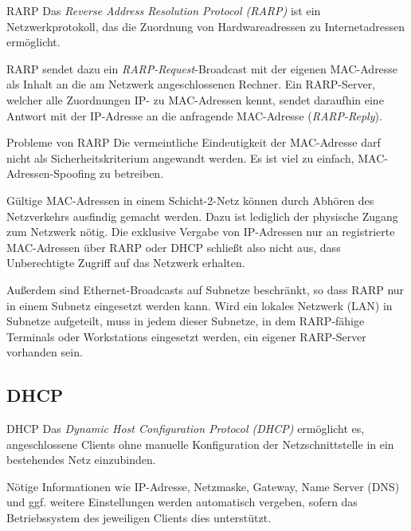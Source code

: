 \begin{defi}{RARP}
    Das \emph{Reverse Address Resolution Protocol (RARP)} ist ein Netzwerkprotokoll, das die Zuordnung von Hardwareadressen zu Internetadressen ermöglicht.

    RARP sendet dazu ein \emph{RARP-Request}-Broadcast mit der eigenen MAC-Adresse als Inhalt an die am Netzwerk angeschlossenen Rechner.
    Ein RARP-Server, welcher alle Zuordnungen IP- zu MAC-Adressen kennt, sendet daraufhin eine Antwort mit der IP-Adresse an die anfragende MAC-Adresse (\emph{RARP-Reply}).
\end{defi}

\begin{bonus}{Probleme von RARP}
    Die vermeintliche Eindeutigkeit der MAC-Adresse darf nicht als Sicherheitskriterium angewandt werden. Es ist viel zu einfach, MAC-Adressen-Spoofing zu betreiben.

    Gültige MAC-Adressen in einem Schicht-2-Netz können durch Abhören des Netzverkehrs ausfindig gemacht werden. Dazu ist lediglich der physische Zugang zum Netzwerk nötig.
    Die exklusive Vergabe von IP-Adressen nur an registrierte MAC-Adressen über RARP oder DHCP schließt also nicht aus, dass Unberechtigte Zugriff auf das Netzwerk erhalten.

    Außerdem sind Ethernet-Broadcasts auf Subnetze beschränkt, so dass RARP nur in einem Subnetz eingesetzt werden kann.
    Wird ein lokales Netzwerk (LAN) in Subnetze aufgeteilt, muss in jedem dieser Subnetze, in dem RARP-fähige Terminals oder Workstations eingesetzt werden, ein eigener RARP-Server vorhanden sein.
\end{bonus}

\subsection{DHCP}

\begin{defi}{DHCP}
    Das \emph{Dynamic Host Configuration Protocol (DHCP)} ermöglicht es, angeschlossene Clients ohne manuelle Konfiguration der Netzschnittstelle in ein bestehendes Netz einzubinden.

    Nötige Informationen wie IP-Adresse, Netzmaske, Gateway, Name Server (DNS) und ggf. weitere Einstellungen werden automatisch vergeben, sofern das Betriebssystem des jeweiligen Clients dies unterstützt.
\end{defi}

